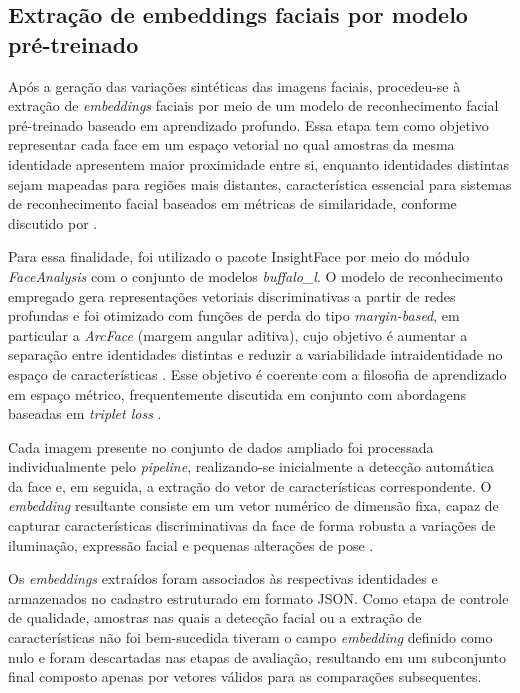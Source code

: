 
\subsection{Extração de embeddings faciais por modelo pré-treinado}

Após a geração das variações sintéticas das imagens faciais, procedeu-se à extração de \textit{embeddings} faciais por meio de um modelo de reconhecimento facial pré-treinado baseado em aprendizado profundo. Essa etapa tem como objetivo representar cada face em um espaço vetorial no qual amostras da mesma identidade apresentem maior proximidade entre si, enquanto identidades distintas sejam mapeadas para regiões mais distantes, característica essencial para sistemas de reconhecimento facial baseados em métricas de similaridade, conforme discutido por \textcite{ge2018hierarchical}.

Para essa finalidade, foi utilizado o pacote InsightFace por meio do módulo \textit{FaceAnalysis} com o conjunto de modelos \textit{buffalo\_l}. O modelo de reconhecimento empregado gera representações vetoriais discriminativas a partir de redes profundas e foi otimizado com funções de perda do tipo \textit{margin-based}, em particular a \textit{ArcFace} (margem angular aditiva), cujo objetivo é aumentar a separação entre identidades distintas e reduzir a variabilidade intraidentidade no espaço de características \cite{deng2019arcface}. Esse objetivo é coerente com a filosofia de aprendizado em espaço métrico, frequentemente discutida em conjunto com abordagens baseadas em \textit{triplet loss} \cite{ge2018hierarchical}.

Cada imagem presente no conjunto de dados ampliado foi processada individualmente pelo \textit{pipeline}, realizando-se inicialmente a detecção automática da face e, em seguida, a extração do vetor de características correspondente. O \textit{embedding} resultante consiste em um vetor numérico de dimensão fixa, capaz de capturar características discriminativas da face de forma robusta a variações de iluminação, expressão facial e pequenas alterações de pose \cite{kaya2019deep}.

Os \textit{embeddings} extraídos foram associados às respectivas identidades e armazenados no cadastro estruturado em formato \acs{JSON}. Como etapa de controle de qualidade, amostras nas quais a detecção facial ou a extração de características não foi bem-sucedida tiveram o campo \textit{embedding} definido como nulo e foram descartadas nas etapas de avaliação, resultando em um subconjunto final composto apenas por vetores válidos para as comparações subsequentes.

